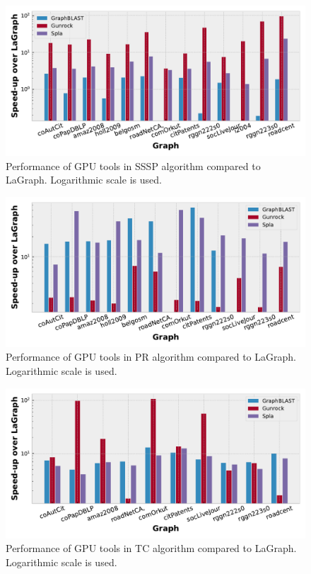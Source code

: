 \begin{figure}[]
\centering
\includegraphics[width=0.95\linewidth]{plots/rq1_rel_sssp.pdf}
\caption{Performance of GPU tools in SSSP algorithm compared to LaGraph. Logarithmic scale is used.}
\label{fig:rq1_sssp}
\end{figure}

\begin{figure}[]
\centering
\includegraphics[width=0.95\linewidth]{plots/rq1_rel_pr.pdf}
\caption{Performance of GPU tools in PR algorithm compared to LaGraph. Logarithmic scale is used.}
\label{fig:rq1_pr}
\end{figure}

\begin{figure}[]
\centering
\includegraphics[width=0.95\linewidth]{plots/rq1_rel_tc.pdf}
\caption{Performance of GPU tools in TC algorithm compared to LaGraph. Logarithmic scale is used.}
\label{fig:rq1_tc}
\end{figure}


